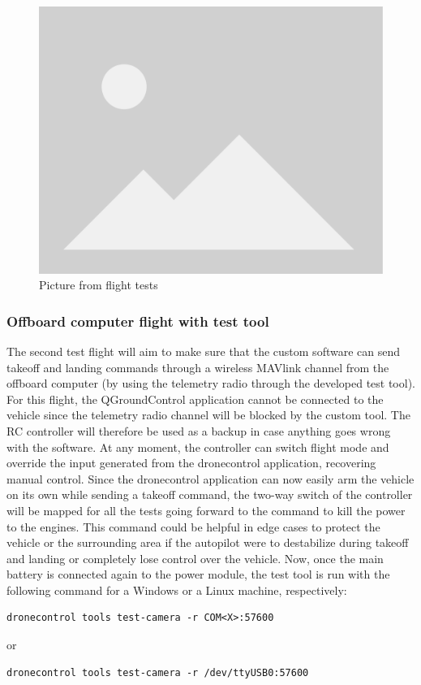 
\begin{figure}
  \centering
  \includegraphics[width=.6\textwidth, keepaspectratio]{img/placeholder.png}
  \caption{Picture from flight tests}
  \label{fig:flight-test-basic}
\end{figure}

\subsubsection{Offboard computer flight with test tool}
\label{subsec:fl-test-2}

The second test flight will aim to make sure that the custom software can send takeoff and landing commands through a wireless MAVlink channel from the offboard computer (by using the telemetry radio through the developed test tool).
For this flight, the QGroundControl application cannot be connected to the vehicle since the telemetry radio channel will be blocked by the custom tool.
The RC controller will therefore be used as a backup in case anything goes wrong with the software.
At any moment, the controller can switch flight mode and override the input generated from the dronecontrol application, recovering manual control.
Since the dronecontrol application can now easily arm the vehicle on its own while sending a takeoff command,
the two-way switch of the controller will be mapped for all the tests going forward to the command to kill the power to the engines.
This command could be helpful in edge cases to protect the vehicle or the surrounding area if the autopilot were to destabilize during takeoff and landing or completely lose control over the vehicle.
Now, once the main battery is connected again to the power module, the test tool is run with the following command for a Windows or a Linux machine, respectively:
\begin{verbatim}
dronecontrol tools test-camera -r COM<X>:57600
\end{verbatim}
or
\begin{verbatim}
dronecontrol tools test-camera -r /dev/ttyUSB0:57600
\end{verbatim}


